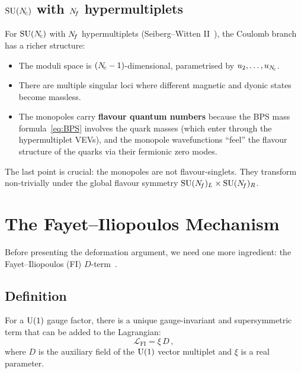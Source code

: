 \documentclass[11pt,a4paper]{article}
\begin{document}
\subsection{$\mathrm{SU}(N_{\!c})$ with $N_{\!f}$ hypermultiplets}

For $\mathrm{SU}(N_{\!c})$ with $N_{\!f}$ hypermultiplets (Seiberg--Witten
II~\cite{SW1994b}), the Coulomb branch has a richer structure:
\begin{itemize}
  \item The moduli space is $(N_{\!c} - 1)$-dimensional, parametrised by
    $u_2, \ldots, u_{N_{\!c}}$.
  \item There are multiple singular loci where different magnetic and
    dyonic states become massless.
  \item The monopoles carry \textbf{flavour quantum numbers} because the
    BPS mass formula~\eqref{eq:BPS} involves the quark masses
    (which enter through the hypermultiplet VEVs), and the monopole
    wavefunctions ``feel'' the flavour structure of the quarks via
    their fermionic zero modes.
\end{itemize}

The last point is crucial: the monopoles are not flavour-singlets.  They
transform non-trivially under the global flavour symmetry
$\mathrm{SU}(N_{\!f})_L \times \mathrm{SU}(N_{\!f})_R$.


\section{The Fayet--Iliopoulos Mechanism}
\label{sec:FI}

Before presenting the deformation argument, we need one more ingredient:
the Fayet--Iliopoulos (FI) $D$-term~\cite{FI1974}.

\subsection{Definition}

For a $\mathrm{U}(1)$ gauge factor, there is a unique gauge-invariant and
supersymmetric term that can be added to the Lagrangian:
\begin{equation}\label{eq:FI}
  \boxed{\mathcal{L}_{\mathrm{FI}} = \xi\, D\,,}
\end{equation}
where $D$ is the auxiliary field of the $\mathrm{U}(1)$ vector multiplet and
$\xi$ is a real parameter.
\end{document}
